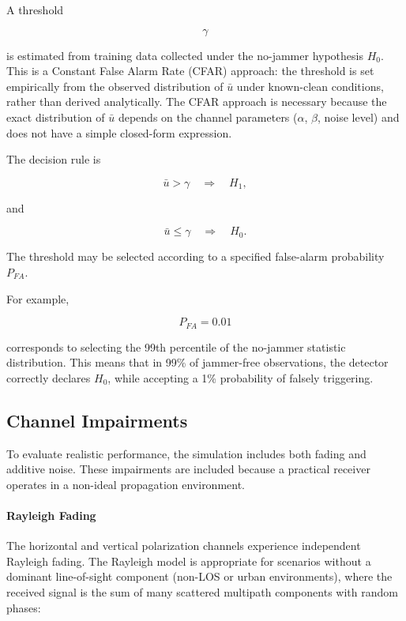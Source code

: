 \documentclass{article}
\begin{document}
A threshold

\begin{equation}
\gamma
\end{equation}

is estimated from training data collected under the no-jammer hypothesis $H_0$. This is a Constant False Alarm Rate (CFAR) approach: the threshold is set empirically from the observed distribution of $\bar{u}$ under known-clean conditions, rather than derived analytically. The CFAR approach is necessary because the exact distribution of $\bar{u}$ depends on the channel parameters ($\alpha$, $\beta$, noise level) and does not have a simple closed-form expression.

The decision rule is

\begin{equation}
\bar{u}>\gamma
\quad\Rightarrow\quad
H_1,
\end{equation}

and

\begin{equation}
\bar{u}\le\gamma
\quad\Rightarrow\quad
H_0.
\end{equation}

The threshold may be selected according to a specified false-alarm probability $P_{FA}$.

For example,

\begin{equation}
P_{FA}=0.01
\end{equation}

corresponds to selecting the 99th percentile of the no-jammer statistic distribution. This means that in 99\% of jammer-free observations, the detector correctly declares $H_0$, while accepting a 1\% probability of falsely triggering.

\subsection{Channel Impairments}

To evaluate realistic performance, the simulation includes both fading and additive noise. These impairments are included because a practical receiver operates in a non-ideal propagation environment.

\paragraph{Rayleigh Fading}

The horizontal and vertical polarization channels experience independent Rayleigh fading. The Rayleigh model is appropriate for scenarios without a dominant line-of-sight component (non-LOS or urban environments), where the received signal is the sum of many scattered multipath components with random phases:
\end{document}
